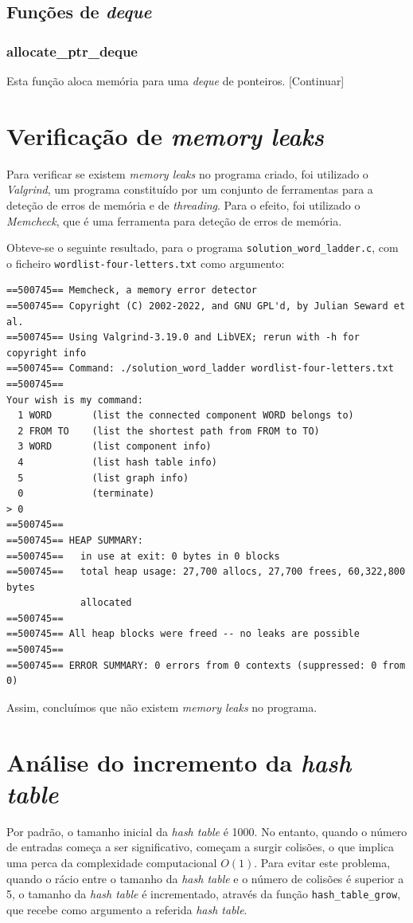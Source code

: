 \documentclass[portuguese,11pt,a4paper,titlepage]{article}
\newcommand{\foreign}[1]{\textit{#1}}
\begin{document}
\subsection{Funções de \textit{deque}}
\subsubsection{allocate\_ptr\_deque}
Esta função aloca memória para uma \textit{deque} de ponteiros. [Continuar]

\pagebreak
\section{Verificação de \textit{memory leaks}}
Para verificar se existem \textit{memory leaks} no programa criado, foi utilizado o \foreign{Valgrind}, um programa constituído por um conjunto de ferramentas para a deteção de erros de memória e de \foreign{threading}. Para o efeito, foi utilizado o \foreign{Memcheck}, que é uma ferramenta para deteção de erros de memória.

Obteve-se o seguinte resultado, para o programa \verb|solution_word_ladder.c|, com o ficheiro \verb|wordlist-four-letters.txt| como argumento:

\begin{verbatim}
==500745== Memcheck, a memory error detector
==500745== Copyright (C) 2002-2022, and GNU GPL'd, by Julian Seward et al.
==500745== Using Valgrind-3.19.0 and LibVEX; rerun with -h for copyright info
==500745== Command: ./solution_word_ladder wordlist-four-letters.txt
==500745== 
Your wish is my command:
  1 WORD       (list the connected component WORD belongs to)
  2 FROM TO    (list the shortest path from FROM to TO)
  3 WORD       (list component info)
  4            (list hash table info)
  5            (list graph info)
  0            (terminate)
> 0
==500745== 
==500745== HEAP SUMMARY:
==500745==   in use at exit: 0 bytes in 0 blocks
==500745==   total heap usage: 27,700 allocs, 27,700 frees, 60,322,800 bytes
             allocated
==500745== 
==500745== All heap blocks were freed -- no leaks are possible
==500745== 
==500745== ERROR SUMMARY: 0 errors from 0 contexts (suppressed: 0 from 0)
\end{verbatim}

Assim, concluímos que não existem \textit{memory leaks} no programa. 

\pagebreak
\section{Análise do incremento da \textit{hash table}}
Por padrão, o tamanho inicial da \textit{hash table} é 1000. No entanto, quando o número de entradas começa a ser significativo, começam a surgir colisões, o que implica uma perca da complexidade computacional \begin{math}O(1)\end{math}. Para evitar este problema, quando o rácio entre o tamanho da \textit{hash table} e o número de colisões é superior a 5, o tamanho da \textit{hash table} é incrementado, através da função \verb|hash_table_grow|, que recebe como argumento a referida \textit{hash table}.
\end{document}
